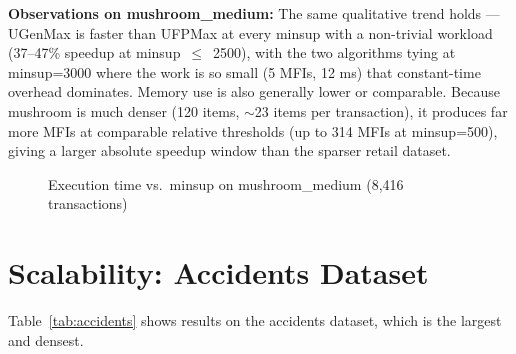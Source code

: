 \documentclass[12pt,a4paper]{report}
\begin{document}
  \textbf{Observations on mushroom\_medium:} The same qualitative trend holds --- UGenMax is faster than UFPMax at every minsup with a non-trivial workload (37--47\% speedup at minsup~$\leq$~2500), with the two algorithms tying at minsup=3000 where the work is so small (5 MFIs, 12 ms) that constant-time overhead dominates. Memory use is also generally lower or comparable. Because mushroom is much denser (120 items, $\sim$23 items per transaction), it produces far more MFIs at comparable relative thresholds (up to 314 MFIs at minsup=500), giving a larger absolute speedup window than the sparser retail dataset.

  \begin{figure}[h]
    \centering
    \caption{Execution time vs.\ minsup on mushroom\_medium (8,416 transactions)}
    \label{fig:mushroom_time}
  \end{figure}

  \section{Scalability: Accidents Dataset}

  Table~\ref{tab:accidents} shows results on the accidents dataset, which is the largest and densest.
\end{document}
